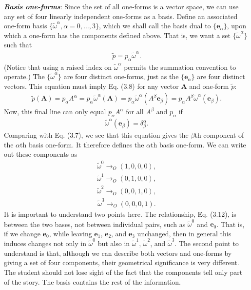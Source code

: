 \documentclass[11pt,letterpaper]{book}
\begin{document}
    \textit{\textbf{Basis one-forms}}: Since the set of all one-forms is a vector space, we can use any set of four linearly independent one-forms as a basis. Define an associated one-form basis \(\{ \tilde{\omega}^\alpha, \alpha = 0, \dots, 3 \}\), which we shall call the basis dual to \(\{\mathbf{e}_\alpha\}\), upon which a one-form has the components defined above. That is, we want a set \(\{\tilde{\omega}^\alpha\}\) such that    \begin{align}
    \tilde{p} = p_\alpha \tilde{\omega}^\alpha. \tag{3.11}
    \end{align}
    (Notice that using a raised index on \(\tilde{\omega}^\alpha\) permits the summation convention to operate.) The \(\{\tilde{\omega}^\alpha\}\) are four distinct one-forms, just as the \(\{\mathbf{e}_\alpha\}\) are four distinct vectors. This equation must imply Eq. (3.8) for any vector \(\mathbf{A}\) and one-form \(\tilde{p}\):
    \begin{align}
    \tilde{p}(\mathbf{A}) = p_\alpha A^\alpha= p_\alpha \tilde{\omega}^\alpha(\mathbf{A})
    = p_\alpha \tilde{\omega}^\alpha(A^\beta \mathbf{e}_\beta)
    = p_\alpha A^\beta \tilde{\omega}^\alpha(\mathbf{e}_\beta).
    \end{align}
    Now, this final line can only equal \(p_\alpha A^\alpha\) for all \(A^\beta\) and \(p_\alpha\) if
    \begin{align}
    \tilde{\omega}^\alpha(\mathbf{e}_\beta) = \delta^\alpha_\beta. \tag{3.12}
    \end{align}
    Comparing with Eq. (3.7), we see that this equation gives the \(\beta\)th component of the \(\alpha\)th basis one-form. It therefore defines the \(\alpha\)th basis one-form. We can write out these components as
    \begin{align}
    \tilde{\omega}^0 \rightarrow_O (1, 0, 0, 0),
    \end{align}
    \begin{align}
    \tilde{\omega}^1 \rightarrow_O (0, 1, 0, 0),
    \end{align}
    \begin{align}
    \tilde{\omega}^2 \rightarrow_O (0, 0, 1, 0),
    \end{align}
    \begin{align}
    \tilde{\omega}^3 \rightarrow_O (0, 0, 0, 1).
    \end{align}
    It is important to understand two points here. The relationship, Eq. (3.12), is between the two bases, not between individual pairs, such as \(\tilde{\omega}^0\) and \(\mathbf{e}_0\). That is, if we change \(\mathbf{e}_0\), while leaving \(\mathbf{e}_1\), \(\mathbf{e}_2\), and \(\mathbf{e}_3\) unchanged, then in general this induces changes not only in \(\tilde{\omega}^0\) but also in \(\tilde{\omega}^1\), \(\tilde{\omega}^2\), and \(\tilde{\omega}^3\). The second point to understand is that, although we can describe both vectors and one-forms by giving a set of four components, their geometrical significance is very different. The student should not lose sight of the fact that the components tell only part of the story. The basis contains the rest of the information.
\end{document}

